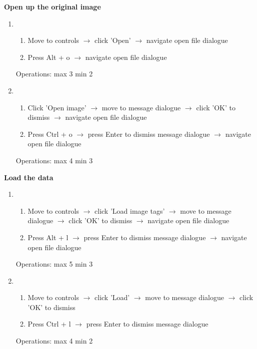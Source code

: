 \documentclass[a4paper,11pt,oneside]{article}
\begin{document}
{\bf Open up the original image}
\begin{enumerate}
    \item
    \begin{enumerate}
        \item Move to controls $\rightarrow$ click 'Open' $\rightarrow$ navigate open file dialogue
        \item Press Alt + o $\rightarrow$ navigate open file dialogue
    \end{enumerate}
    Operations: max 3 min 2
    \item
    \begin{enumerate}
        \item Click 'Open image' $\rightarrow$ move to message dialogue $\rightarrow$ click 'OK' to dismiss $\rightarrow$ navigate open file dialogue
        \item Press Ctrl + o $\rightarrow$ press Enter to dismiss message dialogue $\rightarrow$ navigate open file dialogue
    \end{enumerate}
    Operations: max 4 min 3
\end{enumerate}

{\bf Load the data}
\begin{enumerate}
    \item
    \begin{enumerate}
        \item Move to controls $\rightarrow$ click 'Load image tags' $\rightarrow$ move to message dialogue $\rightarrow$ click 'OK' to dismiss $\rightarrow$ navigate open file dialogue
        \item Press Alt + l $\rightarrow$ press Enter to dismiss message dialogue $\rightarrow$ navigate open file dialogue
    \end{enumerate}
    Operations: max 5 min 3
    \item
    \begin{enumerate}
        \item Move to controls $\rightarrow$ click 'Load' $\rightarrow$ move to message dialogue $\rightarrow$ click 'OK' to dismiss
        \item Press Ctrl + l $\rightarrow$ press Enter to dismiss message dialogue
    \end{enumerate}
    Operations: max 4 min 2
\end{enumerate}
\end{document}
